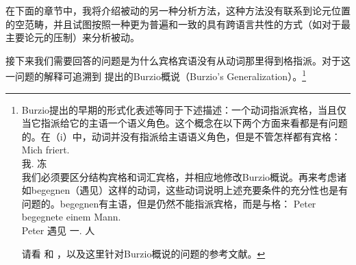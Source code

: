 在下面的章节中，我将介绍被动的另一种分析方法，这种方法没有联系到论元位置的空范畴，并且试图按照一种更为普遍和一致的具有跨语言共性的方式（如对于最主要论元的压制）来分析被动。

接下来我们需要回答的问题是为什么宾格宾语没有从动词那里得到格指派。对于这一问题的解释可追溯到 \citet[--185]{Burzio86a-u-gekauft}提出的Burzio概说（Burzio's Generalization）。\footnote{%
Burzio提出的早期的形式化表述等同于下述描述：一个动词指派宾格，当且仅当它指派给它的主语一个语义角色。这个概念在以下两个方面来看都是有问题的。在（i）中，动词并没有指派给主语语义角色，但是不管怎样都有宾格：
\ea
\gll Mich friert.\\
     我.\acc{} 冻\\
\z
我们必须要区分结构宾格和词汇宾格，并相应地修改Burzio概说。再来考虑诸如begegnen（遇见）这样的动词，这些动词说明上述充要条件的充分性也是有问题的。begegnen有主语，但是仍然不能指派宾格，而是与格：
\ea
\gll Peter begegnete einem Mann.\\
     Peter 遇见 一.\dat{} 人\\
\z

请看 和 ，以及这里针对Burzio概说的问题的参考文献。
}
